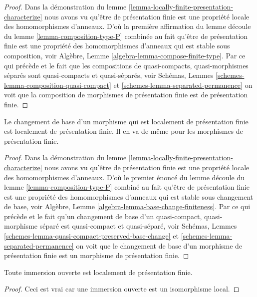 \begin{proof}
Dans la démonstration du lemme \ref{lemma-locally-finite-presentation-characterize} nous avons vu qu'être de
présentation finie est une propriété locale des homomorphismes d'anneaux.
D'où la première affirmation du lemme
découle du lemme \ref{lemma-composition-type-P} combinée au
fait qu'être de présentation finie est une
propriété des homomorphismes
d'anneaux qui est stable
sous composition, voir Algèbre, Lemme \ref{algebra-lemma-compose-finite-type}.
Par ce qui précède et le fait que les compositions
de quasi-compacts, quasi-morphismes
séparés sont quasi-compacts
et quasi-séparés, voir Schémas, Lemmes \ref{schemes-lemma-composition-quasi-compact}
et \ref{schemes-lemma-separated-permanence} on voit que la composition
de morphismes de présentation finie est de présentation
finie.
\end{proof}

\begin{lemma}
\label{lemma-base-change-finite-presentation}
Le changement de base d'un morphisme qui est localement de présentation finie
est localement de présentation finie. Il en va de même pour les morphismes de
présentation finie.
\end{lemma}

\begin{proof}
Dans la démonstration du lemme \ref{lemma-locally-finite-presentation-characterize} nous avons vu qu'être de
présentation finie est une propriété locale des homomorphismes
d'anneaux. D'où le premier énoncé du lemme
découle du lemme \ref{lemma-composition-type-P} combiné au
fait qu'être de présentation finie est une
propriété des homomorphismes
d'anneaux qui est stable
sous changement de base, voir Algèbre, Lemme \ref{algebra-lemma-base-change-finiteness}.
Par ce qui précède et le fait qu'un
changement de base d'un quasi-compact, quasi-morphisme
séparé est quasi-compact
et quasi-séparé, voir Schémas, Lemmes \ref{schemes-lemma-quasi-compact-preserved-base-change}
et \ref{schemes-lemma-separated-permanence} on voit que le changement
de base d'un morphisme de présentation finie est un morphisme
de présentation finie.
\end{proof}

\begin{lemma}
\label{lemma-open-immersion-locally-finite-presentation}
Toute immersion ouverte est localement de présentation finie.
\end{lemma}

\begin{proof}
Ceci est vrai car une immersion ouverte est un isomorphisme local.
\end{proof}

